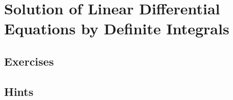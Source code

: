 \flushbottom





\chapter{Solution of Linear Differential Equations by Definite Integrals}
\label{chapter_foo}

















\raggedbottom
\pagebreak
\flushbottom
\section{Exercises}









\raggedbottom
\pagebreak
\flushbottom
\section{Hints}











